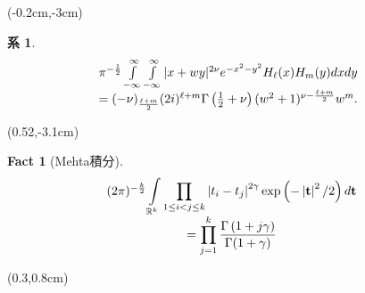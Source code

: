 \documentclass[pdf,notes]{beamer}
\newtheorem*{fact*}{Fact}
\newtheorem{cor}{系}
\begin{document}
\begin{frame}
		\scriptsize
		\setcounter{cor}{0}
	\begin{textblock*}{0.5\textwidth}(-0.2cm,-3cm)
	\begin{cor}\label{cor:int-xzy-hh}
		{\tiny
		\begin{equation*}
			\kern-0.2cm
			\begin{array}[]{c}
				\pi^{-\frac{1}{2}}\int_{- \infty}^{\infty} \int_{- \infty}^{\infty} | x + w y |^{2 \nu} e^{-
			x^2 - y^2} H_\ell (x) H_m (y) d x d y \\= (- \nu)_{\frac{\ell + m}{2}}  (2i)^{\ell + m} \Gamma \left( \frac{1}{2} + \nu \right)
			(w^2 + 1)^{\nu - \frac{\ell + m}{2}} w^m .
			\end{array}
		\end{equation*}
	}
	\end{cor}
	\end{textblock*}
	\begin{textblock*}{0.5\textwidth}(0.52\textwidth,-3.1cm)
		\begin{fact*}[Mehta積分]
			{\tiny
		\begin{equation*}
			\begin{array}[]{c}
			{(2\pi)^{-\frac{k}{2}}}\displaystyle\int_{\mathbb{R}^k}\prod_{1\le i<j\le k}\myabs{t_i-t_j}^{2\gamma}\exp\left( -\myabs{\mathbf{t}}^2/2 \right)d\mathbf{t}\\
			=\displaystyle\prod_{j=1}^k\frac{\Gamma\left( 
			1+j\gamma\right)}{\Gamma(1+\gamma)}
			\end{array}
		\end{equation*}
	}
		\end{fact*}
	\end{textblock*}
	\begin{textblock*}{0.5\textwidth}(0.3\textwidth,0.8cm)
		\tiny
		\xymatrixcolsep{5pc}
		\xymatrixrowsep{3pc}

\end{textblock*}
\end{frame}
\end{document}
